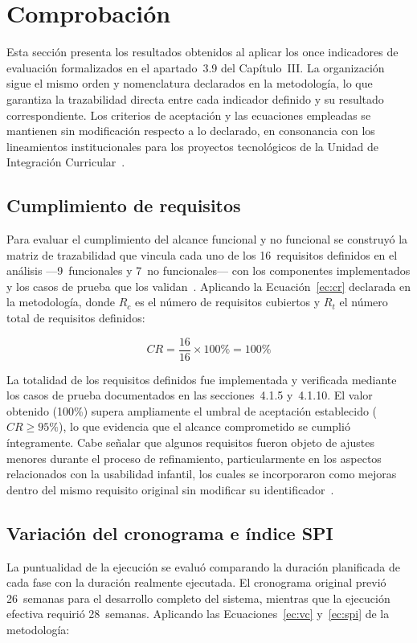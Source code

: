 		\section{Comprobación}
		\label{sec:comprobacion}
			Esta sección presenta los resultados obtenidos al aplicar los once indicadores de evaluación formalizados en el apartado~3.9 del Capítulo~III. La organización sigue el mismo orden y nomenclatura declarados en la metodología, lo que garantiza la trazabilidad directa entre cada indicador definido y su resultado correspondiente. Los criterios de aceptación y las ecuaciones empleadas se mantienen sin modificación respecto a lo declarado, en consonancia con los lineamientos institucionales para los proyectos tecnológicos de la Unidad de Integración Curricular~\cite{GuerreroUlloa2024}.
					
			\subsection{Cumplimiento de requisitos}
			\label{subsec:cr}
				Para evaluar el cumplimiento del alcance funcional y no funcional se construyó la matriz de trazabilidad que vincula cada uno de los 16~requisitos definidos en el análisis ---9~funcionales y 7~no funcionales--- con los componentes implementados y los casos de prueba que los validan~\cite{Pressman2019,Fowler2002}. Aplicando la Ecuación~\eqref{ec:cr} declarada en la metodología, donde $R_c$ es el número de requisitos cubiertos y $R_t$ el número total de requisitos definidos:
				
				\begin{equation}
					CR = \frac{16}{16} \times 100\% = 100\%
				\end{equation}
				
				La totalidad de los requisitos definidos fue implementada y verificada mediante los casos de prueba documentados en las secciones~4.1.5 y~4.1.10. El valor obtenido (100\%) supera ampliamente el umbral de aceptación establecido ($CR \geq 95\%$), lo que evidencia que el alcance comprometido se cumplió íntegramente. Cabe señalar que algunos requisitos fueron objeto de ajustes menores durante el proceso de refinamiento, particularmente en los aspectos relacionados con la usabilidad infantil, los cuales se incorporaron como mejoras dentro del mismo requisito original sin modificar su identificador~\cite{GuerreroUlloa2024}.
				
			\subsection{Variación del cronograma e índice SPI}
			\label{subsec:vc}
				La puntualidad de la ejecución se evaluó comparando la duración planificada de cada fase con la duración realmente ejecutada. El cronograma original previó 26~semanas para el desarrollo completo del sistema, mientras que la ejecución efectiva requirió 28~semanas. Aplicando las Ecuaciones~\eqref{ec:vc} y~\eqref{ec:spi} de la metodología:
				
